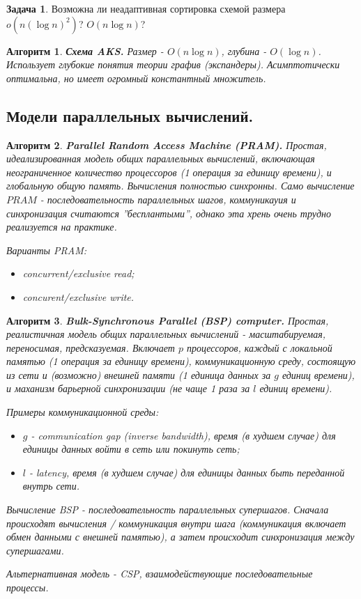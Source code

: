\documentclass[a4paper]{article}
\theoremstyle{indented}
\newtheorem{alg}{Алгоритм}
\theoremstyle{definition}
\newtheorem{prob}{Задача}
\theoremstyle{remark}
\begin{document}
\begin{prob}
    Возможна ли неадаптивная сортировка схемой размера $o(n(\log n)^2)$? $O(n \log n)$?
\end{prob}

\begin{alg}
    \textbf{Схема AKS.} Размер - $O(n \log n)$, глубина - $O(\log n)$. Использует глубокие понятия теории графив (\textit{экспандеры}). Асимптотически оптимальна, но имеет огромный константный множитель.
\end{alg}

\subsection{Модели параллельных вычислений.}

\begin{alg}
    \textbf{Parallel Random Access Machine (PRAM).} Простая, идеализированная модель общих параллельных вычислений, включающая неограниченное количество \textit{процессоров} (1 операция за единицу времени), и глобальную общую память. Вычисления полностью синхронны. Само вычисление $PRAM$ - последовательность параллельных \textit{шагов}, коммуникауия и синхронизация считаются ''бесплантыми'', однако эта хрень очень трудно реализуется на практике. \ 

    Варианты PRAM: 

    \begin{itemize}
        \item concurrent/exclusive read;
        \item concurent/exclusive write.
    \end{itemize}
\end{alg}

\begin{alg}
    \textbf{Bulk-Synchronous Parallel (BSP) computer.} Простая, реалистичная модель общих параллельных вычислений - масштабируемая, переносимая, предсказуемая. Включает $p$ процессоров, каждый с \textit{локальной памятью} (1 операция за единицу времени), \textit{коммуникационную среду}, состоящую из сети и (возможно) \textit{внешней памяти} (1 единица данных за $g$ единиц времени), и маханизм \textit{барьерной синхронизации} (не чаще 1 раза за $l$ единиц времени). \ 

    Примеры коммуникационной среды:

    \begin{itemize}
        \item $g$ - \textit{communication gap} (inverse bandwidth), время (в худшем случае) для единицы данных войти в сеть или покинуть сеть; 
        \item $l$ - \textit{latency}, время (в худшем случае) для единицы данных быть переданной внутрь сети.
    \end{itemize}

    Вычисление BSP - последовательность параллельных \textit{супершагов}. Сначала происходят вычисления / коммуникация внутри шага (коммуникация включает обмен данными с внешней памятью), а затем происходит синхронизация между супершагами. \ 

    Альтернативная модель - CSP, взаимодействующие последовательные процессы.
\end{alg}
\end{document}
